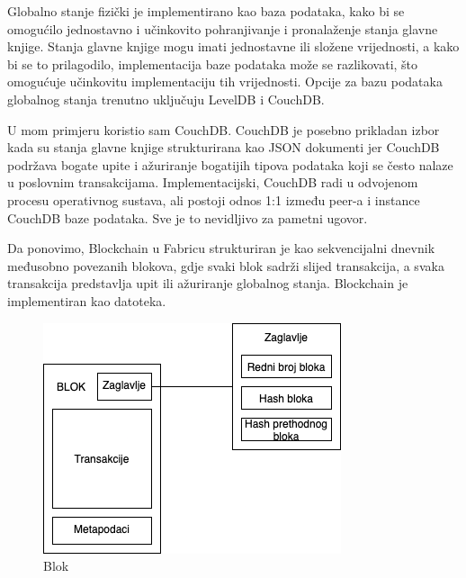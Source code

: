 \documentclass[times, utf8, diplomski]{fer}
\begin{document}
Globalno stanje fizički je implementirano kao baza podataka, kako bi se omogućilo jednostavno i učinkovito pohranjivanje i pronalaženje stanja glavne knjige. Stanja glavne knjige mogu imati jednostavne ili složene vrijednosti, a kako bi se to prilagodilo, implementacija baze podataka može se razlikovati,  što omogućuje učinkovitu implementaciju tih vrijednosti. Opcije za bazu podataka globalnog stanja trenutno uključuju LevelDB i CouchDB.

U mom primjeru koristio sam CouchDB.  CouchDB je posebno prikladan izbor kada su stanja glavne knjige strukturirana kao JSON dokumenti jer CouchDB podržava bogate upite i ažuriranje bogatijih tipova podataka koji se često nalaze u poslovnim transakcijama.  Implementacijski,  CouchDB radi u odvojenom procesu operativnog sustava, ali postoji odnos 1:1 između peer-a i instance CouchDB baze podataka. Sve je to nevidljivo za pametni ugovor.

Da ponovimo, Blockchain u Fabricu strukturiran je kao sekvencijalni dnevnik međusobno povezanih blokova, gdje svaki blok sadrži slijed transakcija, a svaka transakcija predstavlja upit ili ažuriranje globalnog stanja.  Blockchain je implementiran kao datoteka. 

\begin{figure}[htb]
\centering
\includegraphics[scale=0.5]{imgs/Block.png}
\caption{Blok}
\label{fig:blok}
\end{figure}
\end{document}
